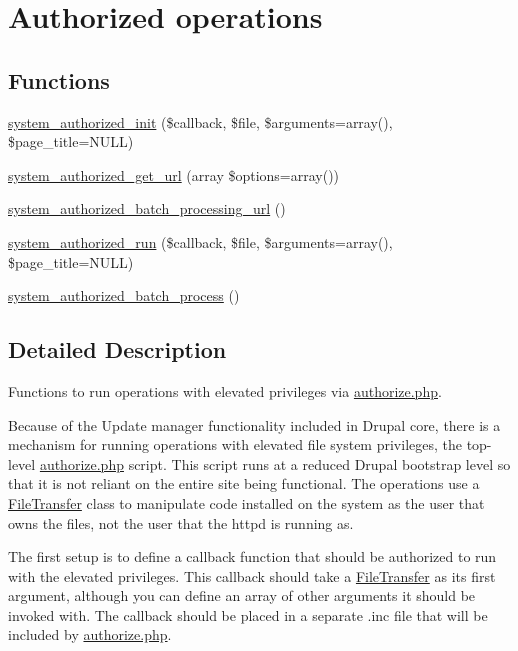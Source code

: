 \hypertarget{group__authorize}{
\section{Authorized operations}
\label{group__authorize}
}
\subsection*{Functions}
\begin{DoxyCompactItemize}
\item 
\hyperlink{group__authorize_ga17756b29805705dbea25798d6004d5dd}{system\_\-authorized\_\-init} (\$callback, \$file, \$arguments=array(), \$page\_\-title=NULL)
\item 
\hyperlink{group__authorize_gab59393fbd369097724650dec4be9c1dd}{system\_\-authorized\_\-get\_\-url} (array \$options=array())
\item 
\hyperlink{group__authorize_gae4eeb93b25a44e4280535f21ed0a0c78}{system\_\-authorized\_\-batch\_\-processing\_\-url} ()
\item 
\hyperlink{group__authorize_gae12fb581acdf9ef042c9137fc6de4d4c}{system\_\-authorized\_\-run} (\$callback, \$file, \$arguments=array(), \$page\_\-title=NULL)
\item 
\hyperlink{group__authorize_ga049418587e2e337a471f3b707d501196}{system\_\-authorized\_\-batch\_\-process} ()
\end{DoxyCompactItemize}


\subsection{Detailed Description}
Functions to run operations with elevated privileges via \hyperlink{authorize_8php}{authorize.php}.

Because of the Update manager functionality included in Drupal core, there is a mechanism for running operations with elevated file system privileges, the top-\/level \hyperlink{authorize_8php}{authorize.php} script. This script runs at a reduced Drupal bootstrap level so that it is not reliant on the entire site being functional. The operations use a \hyperlink{classFileTransfer}{FileTransfer} class to manipulate code installed on the system as the user that owns the files, not the user that the httpd is running as.

The first setup is to define a callback function that should be authorized to run with the elevated privileges. This callback should take a \hyperlink{classFileTransfer}{FileTransfer} as its first argument, although you can define an array of other arguments it should be invoked with. The callback should be placed in a separate .inc file that will be included by \hyperlink{authorize_8php}{authorize.php}.


